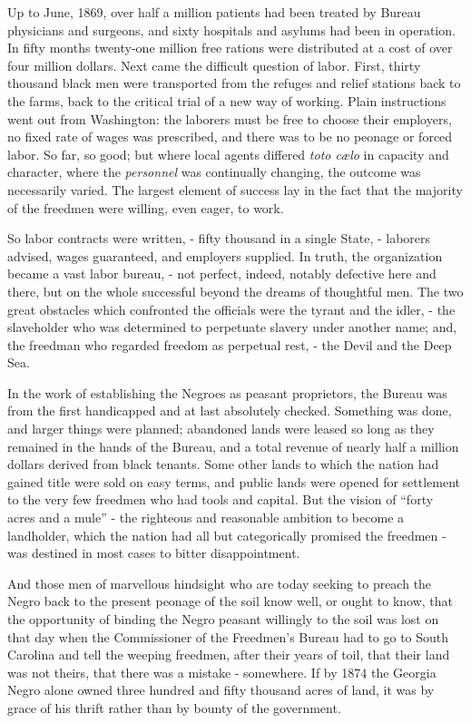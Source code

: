 Up to June, 1869, over half a million patients had been treated by Bureau physicians and surgeons, and sixty hospitals and asylums had been in operation. In fifty months twenty-one million free rations were distributed at a cost of over four million dollars. Next came the difficult question of labor. First, thirty thousand black men were transported from the refuges and relief stations back to the farms, back to the critical trial of a new way of working. Plain instructions went out from Washington: the laborers must be free to choose their employers, no fixed rate of wages was prescribed, and there was to be no peonage or forced labor. So far, so good; but where local agents differed \textit{toto cælo} in capacity and character, where the \textit{personnel} was continually changing, the outcome was necessarily varied. The largest element of success lay in the fact that the majority of the freedmen were willing, even eager, to work.\par

So labor contracts were written, - fifty thousand in a single State, - laborers advised, wages guaranteed, and employers supplied. In truth, the organization became a vast labor bureau, - not perfect, indeed, notably defective here and there, but on the whole successful beyond the dreams of thoughtful men. The two great obstacles which confronted the officials were the tyrant and the idler, - the slaveholder who was determined to perpetuate slavery under another name; and, the freedman who regarded freedom as perpetual rest, - the Devil and the Deep Sea.\par

In the work of establishing the Negroes as peasant proprietors, the Bureau was from the first handicapped and at last absolutely checked. Something was done, and larger things were planned; abandoned lands were leased so long as they remained in the hands of the Bureau, and a total revenue of nearly half a million dollars derived from black tenants. Some other lands to which the nation had gained title were sold on easy terms, and public lands were opened for settlement to the very few freedmen who had tools and capital. But the vision of “forty acres and a mule” - the righteous and reasonable ambition to become a landholder, which the nation had all but categorically promised the freedmen - was destined in most cases to bitter disappointment.\par

And those men of marvellous hindsight who are today seeking to preach the Negro back to the present peonage of the soil know well, or ought to know, that the opportunity of binding the Negro peasant willingly to the soil was lost on that day when the Commissioner of the Freedmen’s Bureau had to go to South Carolina and tell the weeping freedmen, after their years of toil, that their land was not theirs, that there was a mistake - somewhere. If by 1874 the Georgia Negro alone owned three hundred and fifty thousand acres of land, it was by grace of his thrift rather than by bounty of the government.\par

